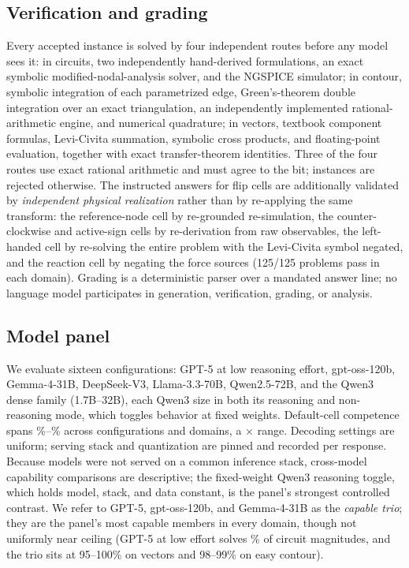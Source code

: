 \documentclass{article}
\begin{document}
\subsection{Verification and grading}\label{sec:verification}
Every accepted instance is solved by four independent routes before any model sees
it: in circuits, two independently hand-derived formulations, an exact symbolic
modified-nodal-analysis solver, and the NGSPICE simulator; in contour, symbolic
integration of each parametrized edge, Green's-theorem double integration over an
exact triangulation, an independently implemented rational-arithmetic engine, and
numerical quadrature; in vectors, textbook component formulas, Levi-Civita
summation, symbolic cross products, and floating-point evaluation, together with
exact transfer-theorem identities. Three of the four routes use exact rational
arithmetic and must agree to the bit; instances are rejected otherwise. The
instructed answers for flip cells are additionally validated by \emph{independent
physical realization} rather than by re-applying the same transform: the
reference-node cell by re-grounded re-simulation, the counter-clockwise and
active-sign cells by re-derivation from raw observables, the left-handed cell by
re-solving the entire problem with the Levi-Civita symbol negated, and the
reaction cell by negating the force sources (125/125 problems pass in each
domain). Grading is a deterministic parser over a mandated answer line; no
language model participates in generation, verification, grading, or analysis.

\subsection{Model panel}\label{sec:panel}
We evaluate sixteen configurations: GPT-5 at low reasoning effort, gpt-oss-120b,
Gemma-4-31B, DeepSeek-V3, Llama-3.3-70B, Qwen2.5-72B, and the Qwen3 dense family
(1.7B--32B), each Qwen3 size in both its reasoning and non-reasoning mode, which
toggles behavior at fixed weights. Default-cell competence spans
\spanLo\%--\spanHi\% across configurations and domains, a \spanRatio$\times$
range. Decoding settings are uniform; serving stack and quantization are pinned and
recorded per response. Because models were not served on a common inference stack,
cross-model capability comparisons are descriptive; the fixed-weight Qwen3
reasoning toggle, which holds model, stack, and data constant, is the panel's
strongest controlled contrast. We refer to GPT-5, gpt-oss-120b, and Gemma-4-31B as the
\emph{capable trio}; they are the panel's most capable members in every domain,
though not uniformly near ceiling (GPT-5 at low effort solves \vCircMagGptFive\%
of circuit magnitudes, and the trio sits at 95--100\% on vectors and 98--99\% on
easy contour).
\end{document}
